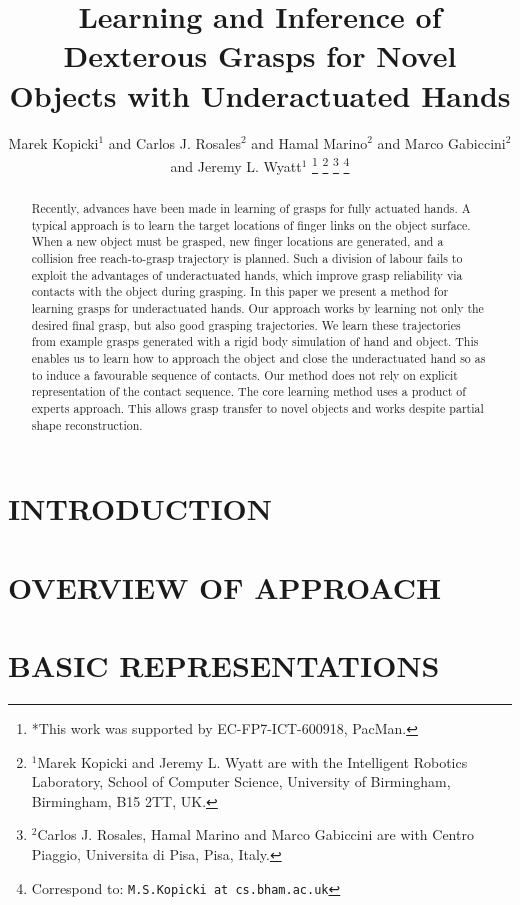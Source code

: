 \documentclass[a4paper, 10pt, conference]{ieeeconf}
\title{\LARGE \bf
Learning and Inference of Dexterous Grasps for Novel Objects with Underactuated Hands
}
\author{Marek Kopicki$^{1}$ and Carlos J. Rosales$^{2}$ and Hamal Marino$^{2}$ and Marco Gabiccini$^{2}$ and Jeremy L. Wyatt$^{1}$%
\thanks{*This work was supported by EC-FP7-ICT-600918, PacMan.}%
\thanks{$^{1}$Marek Kopicki and Jeremy L. Wyatt are with the Intelligent Robotics Laboratory, School of Computer Science,
        University of Birmingham, Birmingham, B15 2TT, UK.}
\thanks{$^{2}$Carlos J. Rosales, Hamal Marino and Marco Gabiccini are with Centro Piaggio, Universita di Pisa, Pisa, Italy.}
\thanks{Correspond to: {\tt\small M.S.Kopicki at cs.bham.ac.uk}}%
}
\begin{document}
\maketitle
\thispagestyle{empty}
\pagestyle{empty}


\begin{abstract}
Recently, advances have been made in learning of grasps for fully actuated hands. A typical approach is to learn the target locations of finger links on the object surface. When a new object must be grasped, new finger locations are generated, and a collision free reach-to-grasp trajectory is planned. Such a division of labour fails to exploit the advantages of underactuated hands, which improve grasp reliability via contacts with the object during grasping. In this paper we present a method for learning grasps for underactuated hands. Our approach works by learning not only the desired final grasp, but also good grasping trajectories. We learn these trajectories from example grasps generated with a rigid body simulation of hand and object. This enables us to learn how to approach the object and close the underactuated hand so as to induce a favourable sequence of contacts. Our method does not rely on explicit representation of the contact sequence. The core learning method uses a product of experts approach. This allows grasp transfer to novel objects and works despite partial shape reconstruction.
\end{abstract}


\section{INTRODUCTION}
\label{sec:introduction}



\section{OVERVIEW OF APPROACH}
\label{sec:overview}


\section{BASIC REPRESENTATIONS}
\label{sec:representations}

\end{document}
